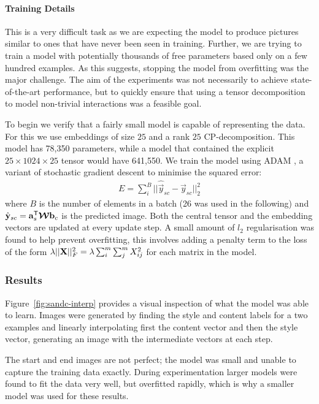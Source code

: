 \paragraph{Training Details}
This is a very difficult task as we are expecting the model to produce pictures similar to ones
that have never been seen in training. Further, we are trying to train a model with potentially
thousands of free parameters based only on a few hundred examples. As this suggests, stopping
the model from overfitting was the major challenge. The aim of the experiments was not
necessarily to achieve state-of-the-art performance, but to quickly ensure that using a tensor
decomposition to model non-trivial interactions was a feasible goal.

To begin we verify that a fairly small model is capable of representing the data. For this we
use embeddings of size \(25\) and a rank \(25\) CP-decomposition. This model has 78,350
parameters, while a model that contained the explicit \(25 \times 1024 \times 25\) tensor
would have 641,550. We train the model using ADAM \autocite{Kingma2014}, a variant of
stochastic gradient descent to minimise the squared error:
\begin{align}
	E = \sum_{i}^B ||\hat{\vec{y}}_{sc} - \vec{y}_{sc}||_2^2
\end{align} where \(B\) is the number of elements in a batch (26 was used in the following) and
\(\hat{\mathbf{y}}_{sc} = \mathbf{a}_s^\mathsf{T}\bm{\mathcal{W}}\mathbf{b}_c\) is the predicted image. Both
the central tensor and the embedding vectors are updated at every update step. A small amount
of \(l_2\) regularisation was found to help prevent overfitting, this involves adding a penalty
term to the loss of the form \(\lambda||\mathbf{X}||_F^2 = \lambda\sum_i^m\sum_j^mX_{ij}^2\) for
each matrix in the model.

\subsubsection{Results}
Figure~\ref{fig:sandc-interp} provides a visual inspection of what the model was able to
learn. Images were generated by finding the style and content labels for a two examples and
linearly interpolating first the content vector and then the style vector, generating an
image with the intermediate vectors at each step. 

The start and end images are not perfect; the model was small and unable to capture the training
data exactly. During experimentation larger models were found to fit the data very well, but 
overfitted rapidly, which is why a smaller model was used for these results.

